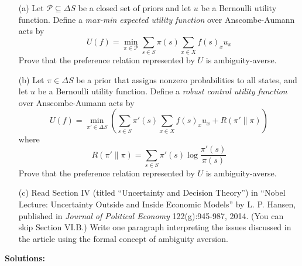 \documentclass[12pt]{article}
\begin{document}
\begin{itemize}
    \item[(a)] Let $\mathcal{P} \subseteq \Delta S$ be a closed set of priors and let $u$ be a Bernoulli utility function. Define a \emph{max-min expected utility function} over Anscombe-Aumann acts by
    \[
    U(f) = \min_{\pi\in\mathcal{P}} \sum_{s \in S} \pi(s) \sum_{x \in X} f(s)_x u_x
    \]
    Prove that the preference relation represented by $U$ is ambiguity-averse.

    \item[(b)] Let $\pi \in \Delta S$ be a prior that assigns nonzero probabilities to all states, and let $u$ be a Bernoulli utility function. Define a \emph{robust control utility function} over Anscombe-Aumann acts by
    \[
    U(f) = \min_{\pi' \in \Delta S} \left( \sum_{s \in S} \pi'(s) \sum_{x \in X} f(s)_x u_x + R(\pi' \| \pi) \right)
    \]
    where
    \[
    R(\pi' \| \pi) = \sum_{s \in S} \pi'(s) \log \frac{\pi'(s)}{\pi(s)}
    \]
    Prove that the preference relation represented by $U$ is ambiguity-averse.

    \item[(c)] Read Section IV (titled ``Uncertainty and Decision Theory'') in ``Nobel Lecture: Uncertainty Outside and Inside Economic Models'' by L. P. Hansen, published in \emph{Journal of Political Economy} 122(g):945-987, 2014. (You can skip Section VI.B.) Write one paragraph interpreting the issues discussed in the article using the formal concept of ambiguity aversion.
\end{itemize}

\medskip
\textbf{Solutions:}
\end{document}
